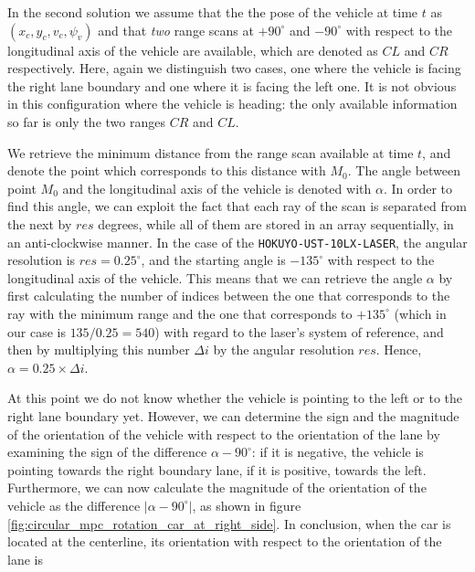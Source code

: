 In the second solution we assume that the the pose of the vehicle at time $t$ as
$(x_c, y_c, v_c, \psi_v)$ and that \textit{two} range scans at $+90^\circ$
and $-90^\circ$ with respect to the longitudinal axis of the vehicle are
available, which are denoted as $CL$ and $CR$ respectively. Here, again we
distinguish two cases, one where the vehicle is facing the right
lane boundary and one where it is facing the left one. It is not obvious
in this configuration where the vehicle is heading: the only available
information so far is only the two ranges $CR$ and $CL$.

We retrieve the  minimum distance from the range scan available at
time $t$, and denote the point which corresponds to this distance with $M_0$. The
angle between point $M_0$ and the longitudinal axis of the vehicle is denoted with
$\alpha$. In order to find this angle, we can exploit the fact that each ray
of the scan is separated from the next by $res$ degrees, while all of them
are stored in an array sequentially, in an anti-clockwise manner. In the case
of the \texttt{HOKUYO-UST-10LX-LASER}, the angular resolution is
$res=0.25^{\circ}$, and the starting angle is $-135^{\circ}$ with respect to the
longitudinal axis of the vehicle. This means that we can retrieve the angle
$\alpha$ by first calculating the number of indices between the one that
corresponds to the ray with the minimum range and the one that corresponds
to $+135^{\circ}$ (which in our case is $135 / 0.25 = 540$) with regard to the
laser's system of reference, and then by multiplying this number $\Delta i$ by
the angular resolution $res$. Hence, $\alpha = 0.25 \times \Delta i$.


\begin{figure}[H]\centering
  \scalebox{1}{}
  \caption{}
  \label{}
\end{figure}

At this point we do not know whether the vehicle is pointing to the
left or to the right lane boundary yet. However, we can determine the sign and the
magnitude of the orientation of the vehicle with respect to the orientation of
the lane by examining the sign of the difference $\alpha - 90^{\circ}$:
if it is negative, the vehicle is pointing towards the right boundary lane,
if it is positive, towards the left. Furthermore, we can now
calculate the magnitude of the orientation of the vehicle as the difference
$|\alpha - 90^{\circ}|$, as shown in figure \ref{fig:circular_mpc_rotation_car_at_right_side}.
In conclusion, when the car is located at the centerline, its orientation with
respect to the orientation of the lane is

